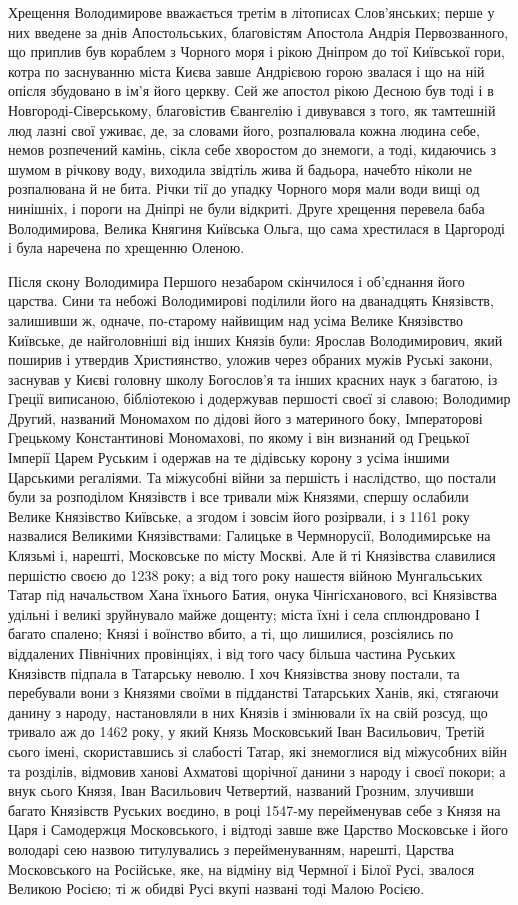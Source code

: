 Хрещення Володимирове вважається третім в літописах Слов'янських; перше у них
введене за днів Апостольських, благовістям Апостола Андрія Первозванного, що
приплив був кораблем з Чорного моря і рікою Дніпром до тої Київської гори,
котра по заснуванню міста Києва завше Андрієвою горою звалася і що на ній
опісля збудовано в ім'я його церкву.  Сей же апостол рікою Десною був тоді і в
Новгороді-Сіверському, благовістив Євангелію і дивувався з того, як тамтешній
люд лазні свої уживає, де, за словами його, розпалювала кожна людина себе,
немов розпечений камінь, сікла себе хворостом до знемоги, а тоді, кидаючись з
шумом в річкову воду, виходила звідтіль жива й бадьора, начебто ніколи не
розпалювана й не бита. Річки тії до упадку Чорного моря мали води вищі од
нинішніх, і пороги на Дніпрі не були відкриті. Друге хрещення перевела баба
Володимирова, Велика Княгиня Київська Ольга, що сама хрестилася в Царгороді і
була наречена по хрещенню Оленою.

Після скону Володимира Першого незабаром скінчилося і об'єднання його царства.
Сини та небожі Володимирові поділили його на дванадцять Князівств, залишивши ж,
одначе, по-старому найвищим над усіма Велике Князівство Київське, де
найголовніші від інших Князів були: Ярослав Володимирович, який поширив і
утвердив Християнство, уложив через обраних мужів Руські закони, заснував у
Києві головну школу Богослов'я та інших красних наук з багатою, із Греції
виписаною, бібліотекою і додержував першості своєї зі славою; Володимир Другий,
названий Мономахом по дідові його з материного боку, Імператорові Грецькому
Константинові Мономахові, по якому і він визнаний од Грецької Імперії Царем
Руським і одержав на те дідівську корону з усіма іншими Царськими регаліями. Та
міжусобні війни за першість і наслідство, що постали були за розподілом
Князівств і все тривали між Князями, спершу ослабили Велике Князівство
Київське, а згодом і зовсім його розірвали, і з 1161 року назвалися Великими
Князівствами: Галицьке в Чермнорусії, Володимирське на Клязьмі і, нарешті,
Московське по місту Москві. Але й ті Князівства славилися першістю своєю до
1238 року; а від того року нашестя війною Мунгальських Татар під начальством
Хана їхнього Батия, онука Чінгісханового, всі Князівства удільні і великі
зруйнувало майже дощенту; міста їхні і села сплюндровано І багато спалено;
Князі і воїнство вбито, а ті, що лишилися, розсіялись по віддалених Північних
провінціях, і від того часу більша частина Руських Князівств підпала в
Татарську неволю. І хоч Князівства знову постали, та перебували вони з Князями
своїми в підданстві Татарських Ханів, які, стягаючи данину з народу,
настановляли в них Князів і змінювали їх на свій розсуд, що тривало аж до 1462
року, у який Князь Московський Іван Васильович, Третій сього імені,
скориставшись зі слабості Татар, які знемоглися від міжусобних війн та
розділів, відмовив ханові Ахматові щорічної данини з народу і своєї покори; а
внук сього Князя, Іван Васильович Четвертий, названий Грозним, злучивши багато
Князівств Руських воєдино, в році 1547-му перейменував себе з Князя на Царя і
Самодержця Московського, і відтоді завше вже Царство Московське і його володарі
сею назвою титулувались з перейменуванням, нарешті, Царства Московського на
Російське, яке, на відміну від Чермної і Білої Русі, звалося Великою Росією; ті
ж обидві Русі вкупі названі тоді Малою Росією.
